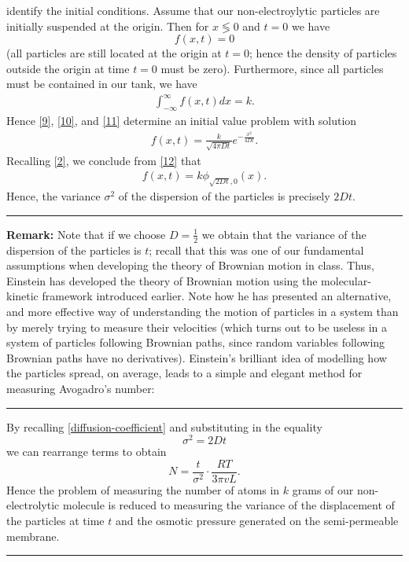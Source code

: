 \documentclass[12pt,reqno]{amsart}
\theoremstyle{plain}  %
\theoremstyle{definition}
\begin{document}
identify the initial conditions. Assume that our
non-electroylytic particles are initially suspended at the origin. Then for $x
\lessgtr 0$ and $t=0$ we have
\begin{equation}
  \label{10}
  f(x,t) = 0
\end{equation}
(all particles are still located at the origin at $t=0$; hence the
density of particles outside the origin at time $t=0$ must be zero). Furthermore, since
all particles must be contained in our tank, we have
\begin{equation}
  \begin{split}
    \int_{-\infty}^{\infty} f(x,t) dx = k.
    \label{11}
  \end{split}
\end{equation}
Hence \eqref{9}, \eqref{10}, and \eqref{11} determine an initial value problem with 
solution
\begin{equation}
  \begin{split}
    f(x,t) = \frac{k}{\sqrt {4 \pi Dt}} e^{-\frac{x^2}{4Dt}}.
    \label{12}
  \end{split}
\end{equation}
Recalling \eqref{2}, we conclude from \eqref{12} that
\begin{equation}
  \begin{split}
    f(x,t)
    = k \phi_{\sqrt{2Dt}, 0}(x).
    \label{13}
  \end{split}
\end{equation}
Hence, the variance $\sigma^2$ of the dispersion of the particles is precisely
$2Dt$. 
\\
\hrule
{\bf Remark:} Note that if we choose $D=\frac{1}{2}$ we obtain that the variance of
the dispersion of the particles is $t$; recall that this was one of our fundamental
assumptions when developing the theory of Brownian motion in class. Thus, Einstein has
developed the theory of Brownian motion using the molecular-kinetic framework
introduced earlier. Note how he has presented an alternative, and more effective way
of understanding the motion of particles in a system than by merely trying to measure
their velocities (which turns out to be useless in a system of particles following
Brownian paths, since random variables following Brownian paths have no derivatives).
Einstein's brilliant idea of modelling how the particles spread, on average, leads to a
simple and elegant method for measuring Avogadro's number:
\\
\hrule
By recalling
\eqref{diffusion-coefficient} and substituting in the equality 
\begin{equation*}
  \sigma^2 = 2Dt
\end{equation*}
we can rearrange terms to obtain
\begin{equation}
  N = \frac{t}{\sigma^2} \cdot \frac{RT}{3 \pi v L}.
\end{equation}
Hence the problem of measuring the number of atoms in $k$ grams of our non-electrolytic
molecule is reduced to measuring the variance of the displacement of the particles at
time $t$ and the osmotic pressure generated on the semi-permeable membrane.
\\
\hrule
\end{document}
